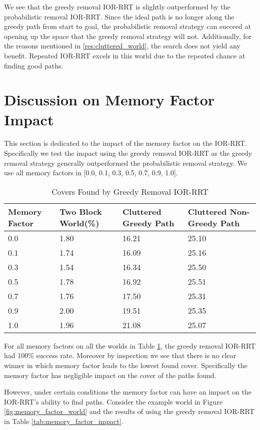 We see that the greedy removal IOR-RRT is slightly outperformed by the probabilistic removal IOR-RRT. Since the ideal path is no longer along the greedy path from start to goal, the probabilistic removal strategy can succeed at opening up the space that the greedy removal strategy will not. Additionally, for the reasons mentioned in \ref{res:cluttered_world}, the search does not yield any benefit. Repeated IOR-RRT excels in this world due to the repeated chance at finding good paths. 

\section{Discussion on Memory Factor Impact}
This section is dedicated to the impact of the memory factor on the IOR-RRT. Specifically we test the impact using the greedy removal IOR-RRT as the greedy removal strategy generally outperformed the probabilistic removal strategy. We use all memory factors in [0.0, 0.1, 0.3, 0.5, 0.7, 0.9, 1.0].

\begin{table}[h!]
\begin{tabular}{@{}llll@{}}
\toprule
Memory Factor & Two Block World(\%)  & Cluttered Greedy Path  & Cluttered Non-Greedy Path \\ 
\midrule
0.0 & 1.80 & 16.21 & 25.10 \\
0.1 & 1.74 & 16.09 & 25.16 \\
0.3 & 1.54 & 16.34 & 25.50 \\
0.5 & 1.78 & 16.92 & 25.51 \\
0.7 & 1.76 & 17.50 & 25.31 \\
0.9 & 2.00 & 19.51 & 25.35 \\ 
1.0 & 1.96 & 21.08 & 25.07 \\
\bottomrule
\end{tabular}
\caption{Covers Found by Greedy Removal IOR-RRT}
\label{tab:memory_factor_no_impact}
\end{table}

For all memory factors on all the worlds in Table \ref{tab:memory_factor_no_impact}, the greedy removal IOR-RRT had 100\% success rate. Moreover by inspection we see that there is no clear winner in which memory factor leads to the lowest found cover. Specifically the memory factor has negligible impact on the cover of the paths found. 

However, under certain conditions the memory factor can have an impact on the IOR-RRT's ability to find paths. Consider the example world in Figure \ref{fig:memory_factor_world} and the results of using the greedy removal IOR-RRT in Table \ref{tab:memory_factor_impact}.



